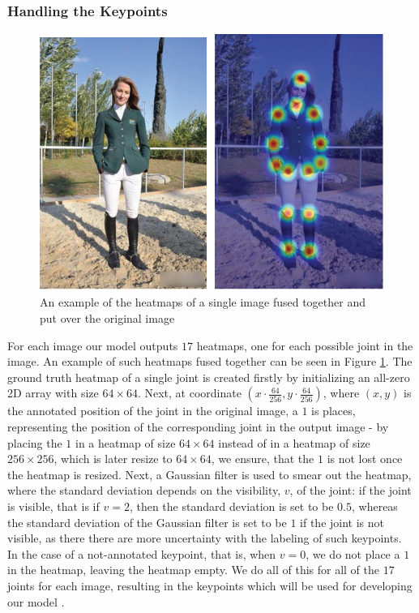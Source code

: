 \documentclass[./main.tex]{subfiles}
\begin{document}
\subsubsection{Handling the Keypoints}
\begin{figure}[htbp]
    \centering
    \includegraphics[height = 4 cm]{./entities/heatmaps_ex.PNG}
    \caption{An example of the heatmaps of a single image fused together and put over the original image \cite{survey_1}}
    \label{fig:heatmaps_ex}
\end{figure}
\noindent For each image our model outputs $17$ heatmaps, one for each possible joint in the image. An example of such heatmaps fused together can be seen in Figure \ref{fig:heatmaps_ex}. The ground truth heatmap of a single joint is created firstly by initializing an all-zero 2D array with size $64 \times 64$. Next, at coordinate $\left( x \cdot \frac{64}{256}, y \cdot \frac{64}{256} \right)$, where $(x, y)$ is the annotated position of the joint in the original image, a $1$ is places, representing the position of the corresponding joint in the output image - by placing the $1$ in a heatmap of size $64 \times 64$ instead of in a heatmap of size $256 \times 256$, which is later resize to $64 \times 64$, we ensure, that the $1$ is not lost once the heatmap is resized. Next, a Gaussian filter is used to smear out the heatmap, where the standard deviation depends on the visibility, $v$, of the joint: if the joint is visible, that is if $v = 2$, then the standard deviation is set to be $0.5$, whereas the standard deviation of the Gaussian filter is set to be $1$ if the joint is not visible, as there there are more uncertainty with the labeling of such keypoints. In the case of a not-annotated keypoint, that is, when $v = 0$, we do not place a $1$ in the heatmap, leaving the heatmap empty. We do all of this for all of the $17$ joints for each image, resulting in the keypoints which will be used for developing our model \cite{Newell}.
\end{document}
